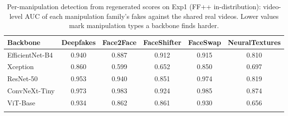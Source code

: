 \begin{table}[!htbp]
\caption{Per-manipulation detection from regenerated scores on Exp1 (FF++ in-distribution): video-level AUC of each manipulation family's fakes against the shared real videos. Lower values mark manipulation types a backbone finds harder.}
\centering
\small
\setlength{\tabcolsep}{3pt}
\begin{tabular}{lccccc}
\toprule
\textbf{Backbone} & \textbf{Deepfakes} & \textbf{Face2Face} & \textbf{FaceShifter} & \textbf{FaceSwap} & \textbf{NeuralTextures} \\
\midrule
EfficientNet-B4 & 0.940 & 0.887 & 0.912 & 0.915 & 0.810 \\
Xception & 0.860 & 0.599 & 0.652 & 0.850 & 0.697 \\
ResNet-50 & 0.953 & 0.940 & 0.851 & 0.974 & 0.819 \\
ConvNeXt-Tiny & 0.973 & 0.983 & 0.924 & 0.985 & 0.874 \\
ViT-Base & 0.934 & 0.862 & 0.861 & 0.930 & 0.656 \\
\botrule
\end{tabular}
\label{tab:per_manip}
\end{table}
